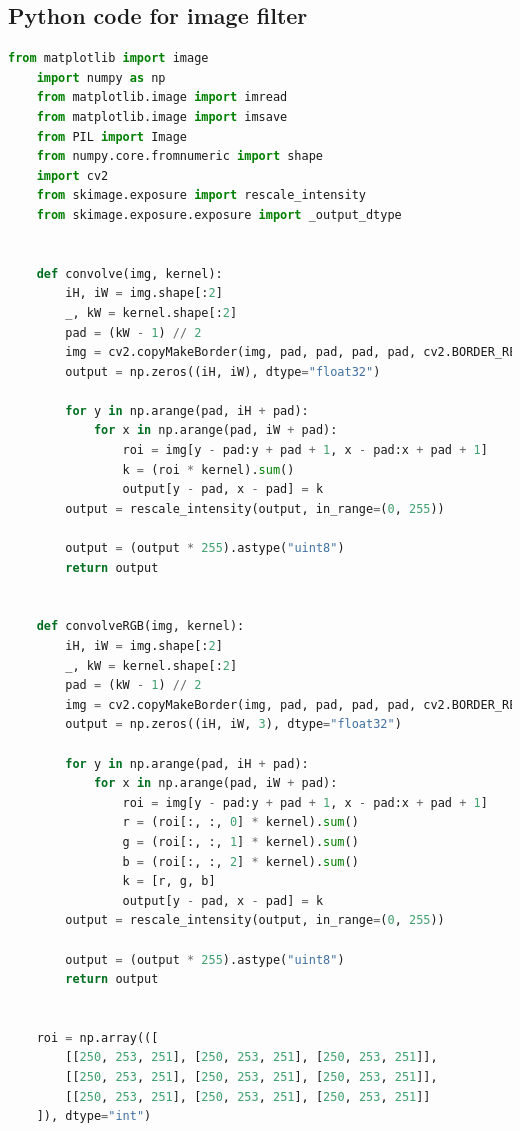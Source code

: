 \documentclass{article}
\begin{document}
\newpage
    \begin{appendices}
        \section{Python code for image filter}
        \label{appendix:1}
        \begin{lstlisting}[language=Python]
            from matplotlib import image
    import numpy as np
    from matplotlib.image import imread
    from matplotlib.image import imsave
    from PIL import Image
    from numpy.core.fromnumeric import shape
    import cv2
    from skimage.exposure import rescale_intensity
    from skimage.exposure.exposure import _output_dtype
    
    
    def convolve(img, kernel):
        iH, iW = img.shape[:2]
        _, kW = kernel.shape[:2]
        pad = (kW - 1) // 2
        img = cv2.copyMakeBorder(img, pad, pad, pad, pad, cv2.BORDER_REPLICATE)
        output = np.zeros((iH, iW), dtype="float32")
    
        for y in np.arange(pad, iH + pad):
            for x in np.arange(pad, iW + pad):
                roi = img[y - pad:y + pad + 1, x - pad:x + pad + 1]
                k = (roi * kernel).sum()
                output[y - pad, x - pad] = k
        output = rescale_intensity(output, in_range=(0, 255))
    
        output = (output * 255).astype("uint8")
        return output
    
    
    def convolveRGB(img, kernel):
        iH, iW = img.shape[:2]
        _, kW = kernel.shape[:2]
        pad = (kW - 1) // 2
        img = cv2.copyMakeBorder(img, pad, pad, pad, pad, cv2.BORDER_REPLICATE)
        output = np.zeros((iH, iW, 3), dtype="float32")
    
        for y in np.arange(pad, iH + pad):
            for x in np.arange(pad, iW + pad):
                roi = img[y - pad:y + pad + 1, x - pad:x + pad + 1]
                r = (roi[:, :, 0] * kernel).sum()
                g = (roi[:, :, 1] * kernel).sum()
                b = (roi[:, :, 2] * kernel).sum()
                k = [r, g, b]
                output[y - pad, x - pad] = k
        output = rescale_intensity(output, in_range=(0, 255))
    
        output = (output * 255).astype("uint8")
        return output
    
    
    roi = np.array(([
        [[250, 253, 251], [250, 253, 251], [250, 253, 251]],
        [[250, 253, 251], [250, 253, 251], [250, 253, 251]],
        [[250, 253, 251], [250, 253, 251], [250, 253, 251]]
    ]), dtype="int")
    

\end{lstlisting}
\end{appendices}
\end{document}
